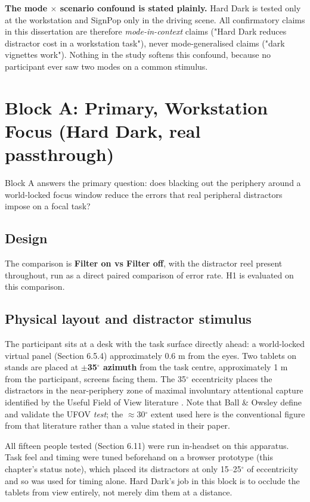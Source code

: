 \textbf{The mode $\times$ scenario confound is stated plainly.} Hard Dark is tested only at the workstation and
SignPop only in the driving scene. All confirmatory claims in this dissertation are therefore
\textit{mode-in-context} claims ("Hard Dark reduces distractor cost in a workstation task"), never
mode-generalised claims ("dark vignettes work"). Nothing in the study softens this confound, because
no participant ever saw two modes on a common stimulus.

\section{Block A: Primary, Workstation Focus (Hard Dark, real passthrough)}

Block A answers the primary question: does blacking out the periphery around a world-locked focus
window reduce the errors that real peripheral distractors impose on a focal task?

\subsection{Design}

The comparison is \textbf{Filter on vs Filter off}, with the distractor reel present throughout, run as a
direct paired comparison of error rate. H1 is evaluated on this comparison.

\subsection{Physical layout and distractor stimulus}

The participant sits at a desk with the task surface directly ahead: a world-locked virtual panel
(Section 6.5.4) approximately 0.6 m from the eyes. Two tablets on stands are placed at \textbf{$\pm$35$^{\circ}$
azimuth} from the task centre, approximately 1 m from the participant, screens facing them. The 35$^{\circ}$
eccentricity places the distractors in the near-periphery zone of maximal involuntary attentional
capture identified by the Useful Field of View literature \citep{ball1993}. Note that Ball \&
Owsley define and validate the UFOV \textit{test}; the $\approx$30$^{\circ}$ extent used here is the conventional figure
from that literature rather than a value stated in their paper.

All fifteen people tested (Section 6.11) were run in-headset on this apparatus. Task feel and timing
were tuned beforehand on a browser prototype (this chapter's status note), which placed its
distractors at only 15–25$^{\circ}$ of eccentricity and so was used for timing alone. Hard Dark's job in
this block is to occlude the tablets from view entirely, not merely dim them at a distance.

